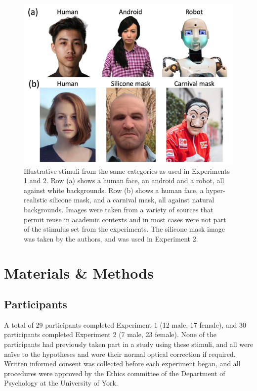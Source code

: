 \documentclass[
]{article}
\begin{document}
\begin{figure}

{\centering \includegraphics[width=0.8\linewidth]{Figures/stimfigure} 

}

\caption{Illustrative stimuli from the same categories as used in Experiments 1 and 2. Row (a) shows a human face, an android and a robot, all against white backgrounds. Row (b) shows a human face, a hyper-realistic silicone mask, and a carnival mask, all against natural backgrounds. Images were taken from a variety of sources that permit reuse in academic contexts and in most cases were not part of the stimulus set from the experiments. The silicone mask image was taken by the authors, and was used in Experiment 2.}\label{fig:stimexamples}
\end{figure}

\hypertarget{materials-methods}{%
\section{Materials \& Methods}\label{materials-methods}}

\hypertarget{participants}{%
\subsection{Participants}\label{participants}}

A total of 29 participants completed Experiment 1 (12 male, 17 female), and 30 participants completed Experiment 2 (7 male, 23 female). None of the participants had previously taken part in a study using these stimuli, and all were naïve to the hypotheses and wore their normal optical correction if required. Written informed consent was collected before each experiment began, and all procedures were approved by the Ethics committee of the Department of Psychology at the University of York.
\end{document}
